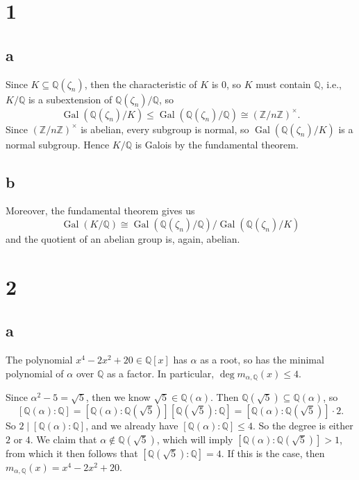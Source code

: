 \documentclass[12pt]{article}
\newcommand{\Z}{\mathbb{Z}}
\newcommand{\Q}{\mathbb{Q}}
\newcommand{\<}{\langle}
\renewcommand{\>}{\rangle}
\newcommand{\isom}{\cong}
\DeclareMathOperator{\Gal}{Gal}
\begin{document}
\thispagestyle{title}



\section*{1}


\subsection*{a}

Since $K \subseteq \Q(\zeta_n)$, then the characteristic of $K$ is $0$, so $K$ must contain $\Q$, i.e., $K/\Q$ is a subextension of $\Q(\zeta_n)/\Q$, so
\[
    \Gal(\Q(\zeta_n)/K) \leq \Gal(\Q(\zeta_n)/\Q) \isom (\Z/n\Z)^\times.
\]
Since $(\Z/n\Z)^\times$ is abelian, every subgroup is normal, so $\Gal(\Q(\zeta_n)/K)$ is a normal subgroup. Hence $K/\Q$ is Galois by the fundamental theorem.

\subsection*{b}

Moreover, the fundamental theorem gives us
\[
    \Gal(K/\Q) \isom \Gal(\Q(\zeta_n)/\Q) / \Gal(\Q(\zeta_n)/K)
\]
and the quotient of an abelian group is, again, abelian.




\newpage
\section*{2}

\subsection*{a}


The polynomial $x^4 - 2x^2 + 20 \in \Q[x]$ has $\alpha$ as a root, so has the minimal polynomial of $\alpha$ over $\Q$ as a factor. In particular, $\deg m_{\alpha, \Q}(x) \leq 4.$

Since $\alpha^2 - 5 = \sqrt{5}$, then we know $\sqrt{5} \in \Q(\alpha)$. Then $\Q(\sqrt{5}) \subseteq \Q(\alpha)$, so
\[
    [\Q(\alpha) : \Q] = [\Q(\alpha) : \Q(\sqrt{5})][\Q(\sqrt{5}) : \Q] = [\Q(\alpha) : \Q(\sqrt{5})] \cdot 2.
\]
So $2 \mid [\Q(\alpha) : \Q]$, and we already have $[\Q(\alpha) : \Q] \leq 4$. So the degree is either $2$ or $4$. We claim that $\alpha \notin \Q(\sqrt{5})$, which will imply $[\Q(\alpha) : \Q(\sqrt{5})] > 1$, from which it then follows that $[\Q(\sqrt{5}) : \Q] = 4$. If this is the case, then $m_{\alpha, \Q}(x) = x^4 - 2x^2 + 20$.
\end{document}
